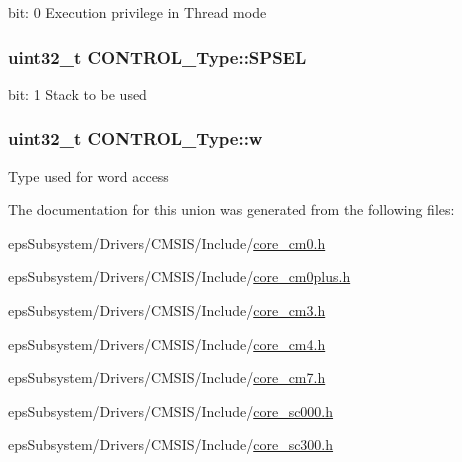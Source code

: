 bit\-: 0 Execution privilege in Thread mode \hypertarget{union_c_o_n_t_r_o_l___type_a8cc085fea1c50a8bd9adea63931ee8e2}{
\subsubsection[{S\-P\-S\-E\-L}]{\setlength{\rightskip}{0pt plus 5cm}uint32\-\_\-t C\-O\-N\-T\-R\-O\-L\-\_\-\-Type\-::\-S\-P\-S\-E\-L}}\label{union_c_o_n_t_r_o_l___type_a8cc085fea1c50a8bd9adea63931ee8e2}
bit\-: 1 Stack to be used \hypertarget{union_c_o_n_t_r_o_l___type_a6b642cca3d96da660b1198c133ca2a1f}{
\subsubsection[{w}]{\setlength{\rightskip}{0pt plus 5cm}uint32\-\_\-t C\-O\-N\-T\-R\-O\-L\-\_\-\-Type\-::w}}\label{union_c_o_n_t_r_o_l___type_a6b642cca3d96da660b1198c133ca2a1f}
Type used for word access 

The documentation for this union was generated from the following files\-:\begin{DoxyCompactItemize}
\item 
eps\-Subsystem/\-Drivers/\-C\-M\-S\-I\-S/\-Include/\hyperlink{core__cm0_8h}{core\-\_\-cm0.\-h}\item 
eps\-Subsystem/\-Drivers/\-C\-M\-S\-I\-S/\-Include/\hyperlink{core__cm0plus_8h}{core\-\_\-cm0plus.\-h}\item 
eps\-Subsystem/\-Drivers/\-C\-M\-S\-I\-S/\-Include/\hyperlink{core__cm3_8h}{core\-\_\-cm3.\-h}\item 
eps\-Subsystem/\-Drivers/\-C\-M\-S\-I\-S/\-Include/\hyperlink{core__cm4_8h}{core\-\_\-cm4.\-h}\item 
eps\-Subsystem/\-Drivers/\-C\-M\-S\-I\-S/\-Include/\hyperlink{core__cm7_8h}{core\-\_\-cm7.\-h}\item 
eps\-Subsystem/\-Drivers/\-C\-M\-S\-I\-S/\-Include/\hyperlink{core__sc000_8h}{core\-\_\-sc000.\-h}\item 
eps\-Subsystem/\-Drivers/\-C\-M\-S\-I\-S/\-Include/\hyperlink{core__sc300_8h}{core\-\_\-sc300.\-h}\end{DoxyCompactItemize}

